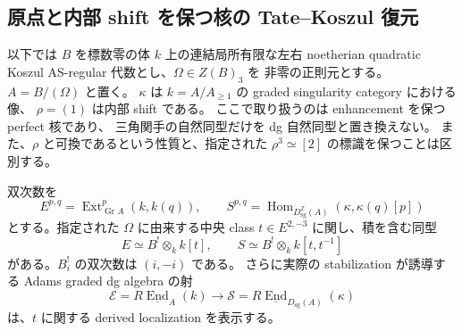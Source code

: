 
\subsection{原点と内部 shift を保つ核の Tate--Koszul 復元}

以下では $B$ を標数零の体 $k$ 上の連結局所有限な左右 noetherian
quadratic Koszul AS-regular 代数とし、$\Omega\in Z(B)_3$ を
非零の正則元とする。$A=B/(\Omega)$ と置く。
$\kappa$ は $k=A/A_{\ge1}$ の graded singularity category における像、
$\rho=(1)$ は内部 shift である。
ここで取り扱うのは enhancement を保つ perfect 核であり、
三角関手の自然同型だけを dg 自然同型と置き換えない。
また、$\rho$ と可換であるという性質と、指定された
$\rho^3\simeq[2]$ の標識を保つことは区別する。

\begin{lemma}
\label{lem:nfm-cubic-tate-cut}
双次数を
\[
 E^{p,q}=\operatorname{Ext}^p_{\operatorname{Gr}A}(k,k(q)),
 \qquad
 S^{p,q}=\operatorname{Hom}_{D_{\mathrm{sg}}^{\mathbb Z}(A)}
                 (\kappa,\kappa(q)[p])
\]
とする。指定された $\Omega$ に由来する中央 class
$t\in E^{2,-3}$ に関し、積を含む同型
\[
 E\simeq B^!\otimes_k k[t],\qquad
 S\simeq B^!\otimes_k k[t,t^{-1}]
\]
がある。$B^!_i$ の双次数は $(i,-i)$ である。
さらに実際の stabilization が誘導する Adams graded dg algebra の射
\[
 \mathcal E=R\underline{\operatorname{End}}_A(k)
       \longrightarrow
 \mathcal S=R\underline{\operatorname{End}}_{D_{\mathrm{sg}}(A)}(\kappa)
\]
は、$t$ に関する derived localization を表示する。
\end{lemma}

